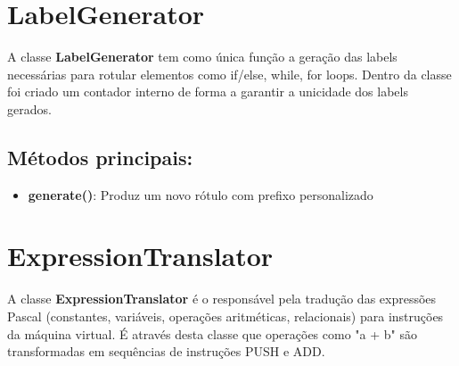 \paragraph{}

\section{LabelGenerator}

A classe \textbf{LabelGenerator} tem como única função a geração das labels necessárias para rotular elementos como if/else, while, for loops. Dentro da classe foi criado um contador interno de forma a garantir a unicidade dos labels gerados.

\subsection*{Métodos principais:}
\begin{itemize}
    \item \textbf{generate()}: Produz um novo rótulo com prefixo personalizado
\end{itemize}

\newpage
\section{ExpressionTranslator}

A classe \textbf{ExpressionTranslator} é o responsável pela tradução das  expressões Pascal (constantes, variáveis, operações aritméticas, relacionais) para instruções da máquina virtual. É através desta classe que operações como "a + b" são transformadas em sequências de instruções PUSH e ADD. 

